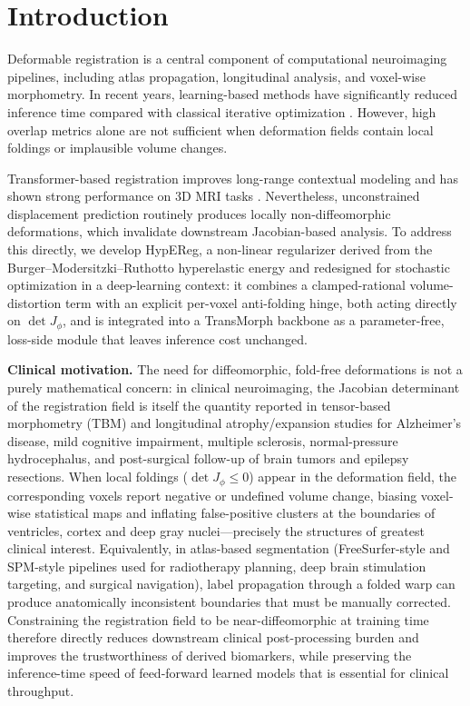 \documentclass[jimaging,article,submit,pdftex,moreauthors]{Definitions/mdpi}
\begin{document}
\section{Introduction}

Deformable registration is a central component of computational neuroimaging pipelines, including atlas propagation, longitudinal analysis, and voxel-wise morphometry. In recent years, learning-based methods have significantly reduced inference time compared with classical iterative optimization \cite{balakrishnan2019voxelmorph,kim2021cyclemorph}. However, high overlap metrics alone are not sufficient when deformation fields contain local foldings or implausible volume changes.

Transformer-based registration improves long-range contextual modeling and has shown strong performance on 3D MRI tasks \cite{chen2022transmorph}. Nevertheless, unconstrained displacement prediction routinely produces locally non-diffeomorphic deformations, which invalidate downstream Jacobian-based analysis. To address this directly, we develop HypEReg, a non-linear regularizer derived from the Burger--Modersitzki--Ruthotto hyperelastic energy \cite{burger2013hyperelastic} and redesigned for stochastic optimization in a deep-learning context: it combines a clamped-rational volume-distortion term with an explicit per-voxel anti-folding hinge, both acting directly on $\det J_\phi$, and is integrated into a TransMorph backbone as a parameter-free, loss-side module that leaves inference cost unchanged.

\noindent\textbf{Clinical motivation.} The need for diffeomorphic, fold-free deformations is not a purely mathematical concern: in clinical neuroimaging, the Jacobian determinant of the registration field is itself the quantity reported in tensor-based morphometry (TBM) and longitudinal atrophy/expansion studies for Alzheimer's disease, mild cognitive impairment, multiple sclerosis, normal-pressure hydrocephalus, and post-surgical follow-up of brain tumors and epilepsy resections. When local foldings (\(\det J_\phi \le 0\)) appear in the deformation field, the corresponding voxels report negative or undefined volume change, biasing voxel-wise statistical maps and inflating false-positive clusters at the boundaries of ventricles, cortex and deep gray nuclei---precisely the structures of greatest clinical interest. Equivalently, in atlas-based segmentation (FreeSurfer-style and SPM-style pipelines used for radiotherapy planning, deep brain stimulation targeting, and surgical navigation), label propagation through a folded warp can produce anatomically inconsistent boundaries that must be manually corrected. Constraining the registration field to be near-diffeomorphic at training time therefore directly reduces downstream clinical post-processing burden and improves the trustworthiness of derived biomarkers, while preserving the inference-time speed of feed-forward learned models that is essential for clinical throughput.
\end{document}
